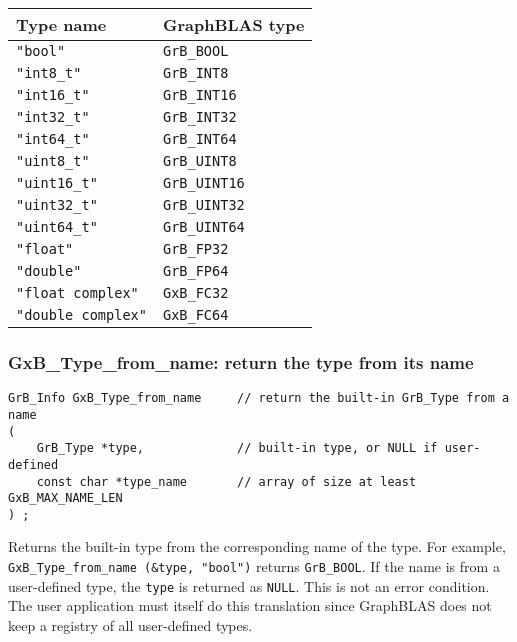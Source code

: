 \documentclass[12pt]{article}
\begin{document}
\vspace{0.2in}
{\small
\begin{tabular}{ll}
\hline
Type name & GraphBLAS type \\
\hline
    \verb'"bool"'           & \verb'GrB_BOOL' \\
    \verb'"int8_t"'         & \verb'GrB_INT8' \\
    \verb'"int16_t"'        & \verb'GrB_INT16' \\
    \verb'"int32_t"'        & \verb'GrB_INT32' \\
    \verb'"int64_t"'        & \verb'GrB_INT64' \\
    \verb'"uint8_t"'        & \verb'GrB_UINT8' \\
    \verb'"uint16_t"'       & \verb'GrB_UINT16' \\
    \verb'"uint32_t"'       & \verb'GrB_UINT32' \\
    \verb'"uint64_t"'       & \verb'GrB_UINT64' \\
    \verb'"float"'          & \verb'GrB_FP32' \\
    \verb'"double"'         & \verb'GrB_FP64' \\
    \verb'"float complex"'  & \verb'GxB_FC32' \\
    \verb'"double complex"' & \verb'GxB_FC64' \\
\hline
\end{tabular}}

\newpage
\subsubsection{{\sf GxB\_Type\_from\_name:} return the type from its name}
\label{type_from_name}

\begin{mdframed}[userdefinedwidth=6in]
{\footnotesize
\begin{verbatim}
GrB_Info GxB_Type_from_name     // return the built-in GrB_Type from a name
(
    GrB_Type *type,             // built-in type, or NULL if user-defined
    const char *type_name       // array of size at least GxB_MAX_NAME_LEN
) ;
\end{verbatim}
}\end{mdframed}

Returns the built-in type from the corresponding name of the type.  For
example, \verb'GxB_Type_from_name (&type, "bool")' returns \verb'GrB_BOOL'.  If
the name is from a user-defined type, the \verb'type' is returned as
\verb'NULL'.  This is not an error condition.  The user application must itself
do this translation since GraphBLAS does not keep a registry of all
user-defined types.
\end{document}
